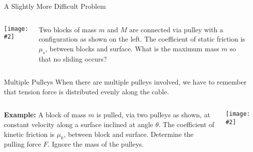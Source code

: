 \documentclass[12pt,compress,aspectratio=169]{beamer}
\newcommand{\pic}[2]{\texttt{[image: \#2]}}
\begin{document}
\begin{frame}{A Slightly More Difficult Problem}
  \begin{columns}
    \pic{1}{graphics/pulley_prob_5.png}
    
    Two blocks of mass $m$ and $M$ are connected via pulley with a
    configuration as shown on the left. The coefficient of static friction is
    $\mu_s$, between blocks and surface. What is the maximum mass $m$ so that
    no sliding occurs?
  \end{columns}
\end{frame}



%    



\begin{frame}{Multiple Pulleys}
  When there are multiple pulleys involved, we have to remember that tension
  force is distributed evenly along the cable.

  \vspace{.2in}
  \begin{columns}
    \textbf{Example:} A block of mass $m$ is pulled, via two pulleys as shown,
    at constant velocity along a surface inclined at angle $\theta$. The
    coefficient of kinetic friction is $\mu_k$, between block and surface.
    Determine the pulling force $F$. Ignore the mass of the pulleys. 
    
    \pic{1}{graphics/pulley_prob_7.png}
  \end{columns}  
\end{frame}


%
%    
\end{document}
